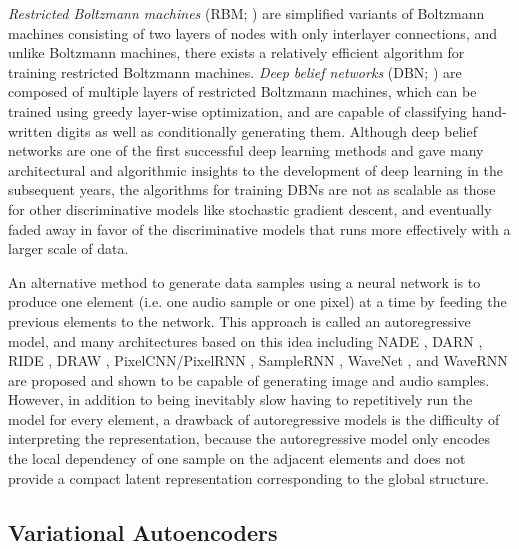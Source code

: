 \emph{Restricted Boltzmann machines} (RBM; ) are simplified variants of Boltzmann machines consisting of two layers of nodes with only interlayer connections, and unlike Boltzmann machines, there exists a relatively efficient algorithm \cite{hinton2005cd} for training restricted Boltzmann machines.
\emph{Deep belief networks} (DBN; ) are composed of multiple layers of restricted Boltzmann machines, which can be trained using greedy layer-wise optimization, and are capable of classifying hand-written digits as well as conditionally generating them.
Although deep belief networks are one of the first successful deep learning methods and gave many architectural and algorithmic insights to the development of deep learning in the subsequent years, the algorithms for training DBNs are not as scalable as those for other discriminative models like stochastic gradient descent, and eventually faded away in favor of the discriminative models that runs more effectively with a larger scale of data.

An alternative method to generate data samples using a neural network is to produce one element (i.e. one audio sample or one pixel) at a time by feeding the previous elements to the network.
This approach is called an autoregressive model, and many architectures based on this idea including NADE \cite{larochelle2011nade}, DARN \cite{gregor2013darn}, RIDE \cite{theis2015ride}, DRAW \cite{gregor2015draw}, PixelCNN/PixelRNN \cite{oord2016pixelrnn}, SampleRNN \cite{mehri2016samplernn}, WaveNet \cite{oord2016wavenet}, and WaveRNN \cite{kalchbrenner2018wavernn} are proposed and shown to be capable of generating image and audio samples.
However, in addition to being inevitably slow having to repetitively run the model for every element, a drawback of autoregressive models is the difficulty of interpreting the representation, because the autoregressive model only encodes the local dependency of one sample on the adjacent elements and does not provide a compact latent representation corresponding to the global structure.

\subsection{Variational Autoencoders}

